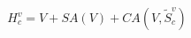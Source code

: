 \begin{equation}
\label{eq:conditioned-visual}
{H}_{c}^{v}=V+SA(V)+CA\left( V,{\widetilde{S}}_{c}^{v}\right) 
\end{equation}
